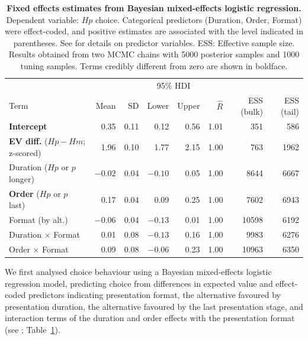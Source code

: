 \documentclass[11pt, a4paper, twocolumn, abstract]{scrartcl}
\begin{document}
\begin{table}[tb!]
	\centering
	{
		\begin{tabular}{lrrrrrrr}
			\toprule
			\multicolumn{1}{c}{} & \multicolumn{1}{c}{} & \multicolumn{1}{c}{} & \multicolumn{2}{c}{95\% HDI} & \multicolumn{1}{c}{} & \multicolumn{1}{c}{} & \multicolumn{1}{c}{} \\
			\cline{4-5}
			Term & Mean & SD & Lower & Upper & $\hat{R}$ & ESS (bulk) & ESS (tail)  \\
			\cmidrule[0.4pt]{1-8}
			\textbf{Intercept} & 0.35 & 0.11 & 0.12 & 0.56 & 1.01 & 351 & 586  \\
			\textbf{EV diff.} ($Hp - Hm$; z-scored) & 1.96 & 0.10 & 1.77 & 2.15 & 1.00 & 763 & 1962  \\
			Duration ($Hp$ or $p$ longer) & $-0.02$ & 0.04 & $-0.10$ & 0.05 & 1.00 & 8644 & 6667  \\
			\textbf{Order} ($Hp$ or $p$ last) & 0.17 & 0.04 & 0.09 & 0.25 & 1.00 & 7602 & 6943  \\
			Format (by alt.) & $-0.06$ & 0.04 & $-0.13$ & 0.01 & 1.00 & 10598 & 6192  \\
			Duration $\times$ Format & 0.01 & 0.08 & $-0.13$ & 0.16 & 1.00 & 9983 & 6276  \\
			Order $\times$ Format & 0.09 & 0.08 & $-0.06$ & 0.23 & 1.00 & 10963 & 6350  \\
			\bottomrule
		\end{tabular}
	}
	\caption{\textbf{Fixed effects estimates from Bayesian mixed-effects logistic regression.} Dependent variable: $Hp$ choice. Categorical predictors (Duration, Order, Format) were effect-coded, and positive estimates are associated with the level indicated in parentheses. See  for details on predictor variables. ESS: Effective sample size. Results obtained from two MCMC chains with 5000 posterior samples and 1000 tuning samples. Terms credibly different from zero are shown in boldface.}
	\label{tab:regression}
\end{table}

We first analysed choice behaviour using a Bayesian mixed-effects logistic regression model, predicting choice from differences in expected value and effect-coded predictors indicating presentation format, the alternative favoured by presentation duration, the alternative favoured by the last presentation stage, and interaction terms of the duration and order effects with the presentation format (see ; Table~\ref{tab:regression}).
\end{document}
